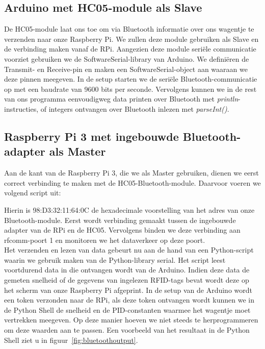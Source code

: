 \subsection{Arduino met HC05-module als Slave}
De HC05-module laat ons toe om via Bluetooth informatie over ons wagentje te verzenden naar onze Raspberry Pi. We zullen deze module gebruiken als Slave en de verbinding maken vanaf de RPi. Aangezien deze module seri\"ele communicatie voorziet gebruiken we de SoftwareSerial-library van Arduino. We defini\"eren de Transmit- en Receive-pin en maken een SoftwareSerial-object aan waaraan we deze pinnen meegeven. In de setup starten we de seri\"ele Bluetooth-communicatie op met een baudrate van 9600 bits per seconde. Vervolgens kunnen we in de rest van ons programma eenvoudigweg data printen over Bluetooth met \emph{println}-instructies, of integers ontvangen over Bluetooth inlezen met \emph{parseInt()}.

\subsection{Raspberry Pi 3 met ingebouwde Bluetooth-adapter als Master}
Aan de kant van de Raspberry Pi 3, die we als Master gebruiken, dienen we eerst correct verbinding te maken met de HC05-Bluetooth-module. Daarvoor voeren we volgend script uit:

Hierin is 98:D3:32:11:64:0C de hexadecimale voorstelling van het adres van onze Bluetooth-module. Eerst wordt verbinding gemaakt tussen de ingebouwde adapter van de RPi en de HC05. Vervolgens binden we deze verbinding aan rfcomm-poort 1 en monitoren we het dataverkeer op deze poort.\\
Het verzenden en lezen van data gebeurt nu aan de hand van een Python-script waarin we gebruik maken van de Python-library serial. Het script leest voortdurend data in die ontvangen wordt van de Arduino. Indien deze data de gemeten snelheid of de gegevens van ingelezen RFID-tags bevat wordt deze op het scherm van onze Raspberry Pi afgeprint. In de setup van de Arduino wordt een token verzonden naar de RPi, als deze token ontvangen wordt kunnen we in de Python Shell de snelheid en de PID-constanten waarmee het wagentje moet vertrekken meegeven. Op deze manier hoeven we niet steeds te herprogrammeren om deze waarden aan te passen. Een voorbeeld van het resultaat in de Python Shell ziet u in figuur~\vref{fig:bluetoothoutput}.


